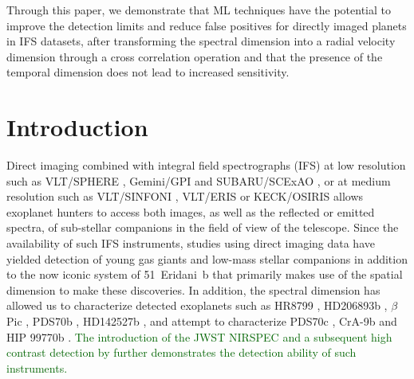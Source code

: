 \documentclass{aa}
\newcommand{\newchange}[1]{\textcolor{darkgreen}{#1}}
\begin{document}
  {Through this paper, we demonstrate that ML techniques have the potential to improve the detection limits and reduce false positives for directly imaged planets in IFS datasets, after transforming the spectral dimension into a radial velocity dimension through a cross correlation operation and that the presence of the temporal dimension does not lead to increased sensitivity.
  }
   

\maketitle
%

\section{Introduction}

Direct imaging combined with integral field spectrographs (IFS) at low resolution such as VLT/SPHERE \citep{2019Beuzit}, Gemini/GPI \citep{2014MacintoshGPI} and SUBARU/SCExAO \citep{2015SCeXAO}, or at medium resolution such as VLT/SINFONI \citep{2004SINFONI}, VLT/ERIS \citep{2023Davies} or KECK/OSIRIS \citep{2000OSIRIS} allows exoplanet hunters to access both images, as well as the reflected or emitted spectra, of sub-stellar companions in the field of view of the telescope.
Since the availability of such IFS instruments, studies using direct imaging data have yielded detection of young gas giants \citep[e.g., PDS70b, ][]{2018KepplerPDS70} and low-mass stellar companions \citep[e.g., HD142527b, ][]{2019ClaudiHD142527b} in addition to the now iconic system of 51~Eridani~b \citep{2015MacintoshEridani} that primarily makes use of the spatial dimension to make these discoveries.
In addition, the spectral dimension has allowed us to characterize detected exoplanets such as HR8799 \citep[e.g][]{2008Marois, 2013Konopacky}, HD206893b \citep[][]{2017DelormeHD206893b}, $\beta$ Pic \citep[][]{2017ChilcoteBetapic}, PDS70b \citep[e.g][]{2018MullerPDS70,2019ChristiaensPDS70}, HD142527b \citep[][]{2018A&ChristiaensHD142527}, and attempt to characterize PDS70c \citep[][]{2019MesaPDS70}, CrA-9b \citep[][]{2021ChristiaensCrA-9b} and HIP 99770b \citep[][]{2023Currie}.
\newchange{The introduction of the JWST NIRSPEC \citet{2022BokerJWST} and a subsequent high contrast detection by \citet{2023RuffioJWST} further demonstrates the detection ability of such instruments.}
\end{document}
